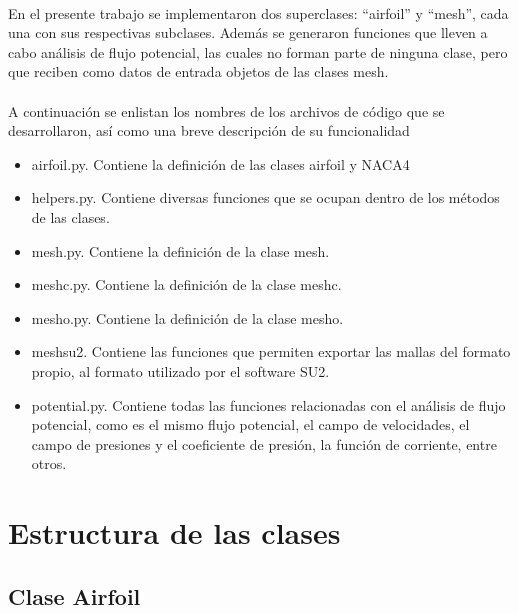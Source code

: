 \documentclass[letterpaper, openright, 12pt]{book}
\begin{document}
    \paragraph*{}
        En el presente trabajo se implementaron dos superclases: ``airfoil'' y
        ``mesh'', cada una con sus respectivas subclases. Además se generaron
        funciones que lleven a cabo análisis de flujo potencial, las cuales
        no forman parte de ninguna clase, pero que reciben como datos de entrada
        objetos de las clases mesh.

    \paragraph*{}
        A continuación se enlistan los nombres de los archivos de código que se
        desarrollaron, así como una breve descripción de su funcionalidad
        \begin{itemize}
            \item airfoil.py. Contiene la definición de las clases airfoil y
                NACA4
            \item helpers.py. Contiene diversas funciones que se ocupan dentro
                de los métodos de las clases.
            \item mesh.py. Contiene la definición de la clase mesh.
            \item mesh\textunderscore c.py. Contiene la definición de la clase
                mesh\textunderscore c.
            \item mesh\textunderscore o.py. Contiene la definición de la clase
                mesh\textunderscore o.
            \item mesh\textunderscore su2. Contiene las funciones que permiten
                exportar las mallas del formato propio, al formato utilizado por
                el software SU2.
            \item potential.py. Contiene todas las funciones relacionadas con
                el análisis de flujo potencial, como es el mismo flujo
                potencial, el campo de velocidades, el campo de presiones y el
                coeficiente de presión, la función de corriente, entre otros.
        \end{itemize}


    \section{Estructura de las clases}
    \subsection{Clase Airfoil}
\end{document}
